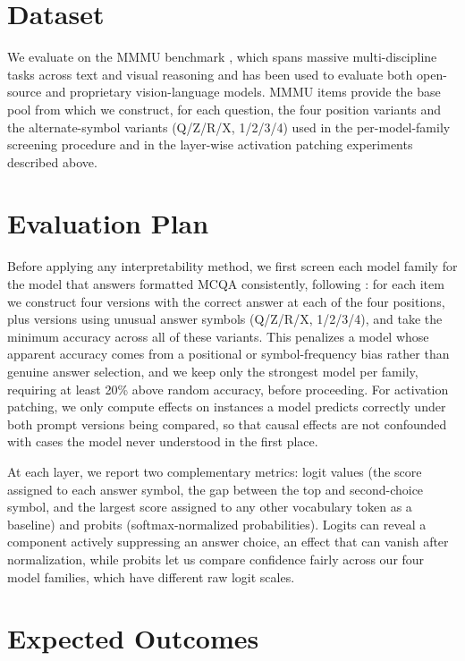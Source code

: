 \documentclass[11pt]{article}
\begin{document}
\section{Dataset}

We evaluate on the MMMU benchmark \cite{yue2024mmmumassivemultidisciplinemultimodal}, which spans massive multi-discipline tasks across text and visual reasoning and has been used to evaluate both open-source and proprietary vision-language models. MMMU items provide the base pool from which we construct, for each question, the four position variants and the alternate-symbol variants (Q/Z/R/X, 1/2/3/4) used in the per-model-family screening procedure and in the layer-wise activation patching experiments described above.

\section{Evaluation Plan}

Before applying any interpretability method, we first screen each model family for the model that answers formatted MCQA consistently, following \cite{wiegreffe2025answerassembleaceunderstanding}: for each item we construct four versions with the correct answer at each of the four positions, plus versions using unusual answer symbols (Q/Z/R/X, 1/2/3/4), and take the minimum accuracy across all of these variants. This penalizes a model whose apparent accuracy comes from a positional or symbol-frequency bias rather than genuine answer selection, and we keep only the strongest model per family, requiring at least 20\% above random accuracy, before proceeding. For activation patching, we only compute effects on instances a model predicts correctly under both prompt versions being compared, so that causal effects are not confounded with cases the model never understood in the first place.

At each layer, we report two complementary metrics: logit values (the score assigned to each answer symbol, the gap between the top and second-choice symbol, and the largest score assigned to any other vocabulary token as a baseline) and probits (softmax-normalized probabilities). Logits can reveal a component actively suppressing an answer choice, an effect that can vanish after normalization, while probits let us compare confidence fairly across our four model families, which have different raw logit scales.

\section{Expected Outcomes}
\end{document}

